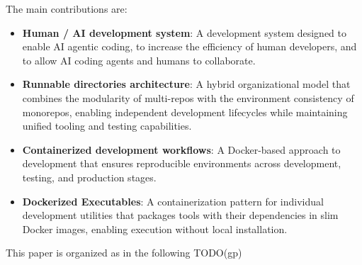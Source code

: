   The main contributions are:

  \begin{itemize}
    \item \textbf{Human / AI development system}:
      A development system designed to enable AI agentic coding, to increase
      the efficiency of human developers, and to allow AI coding agents and
      humans to collaborate.

    \item \textbf{Runnable directories architecture}: A hybrid organizational
      model that combines the modularity of multi-repos with the environment
      consistency of monorepos, enabling independent development
      lifecycles while maintaining unified tooling and testing
      capabilities.

    \item \textbf{Containerized development workflows}: 
      A Docker-based approach to development that ensures reproducible
      environments across development, testing, and production stages.

    \item \textbf{Dockerized Executables}: A containerization pattern for
      individual development utilities that packages tools with their
      dependencies in slim Docker images, enabling execution without local
      installation.
  \end{itemize}

  This paper is organized as in the following
  TODO(gp)

  

  

  

  


